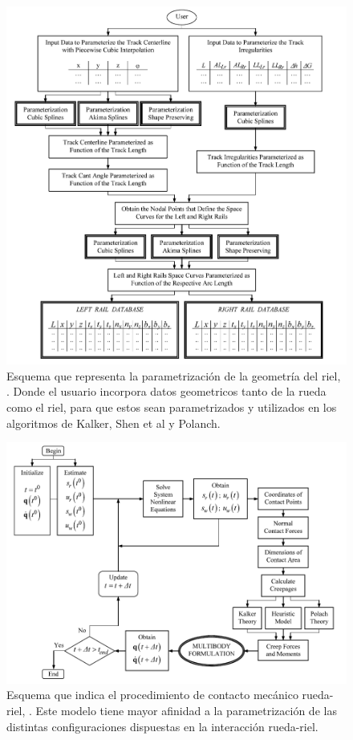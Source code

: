 \documentclass[main]{subfiles}
\begin{document}
\begin{figure}[!htbp]
\centering
    \includegraphics[scale=0.4]{Pombopar.png}
  \caption{Esquema que representa la parametrización  de la geometría del riel, \citet{springerlink:10.1007/s11044-007-9094-y}. Donde el usuario incorpora datos geometricos tanto de la rueda como el riel, para que estos sean parametrizados y utilizados en los algoritmos de Kalker, Shen et al y Polanch.}
  \label{fig:Pombopar}
\end{figure}  
\newpage

\begin{figure}[!htbp]
\centering
    \includegraphics[scale=0.3]{Pombopar2.png}
  \caption{Esquema que indica el procedimiento de contacto mecánico rueda-riel, \citet{springerlink:10.1007/s11044-007-9094-y}. Este modelo tiene mayor afinidad a la parametrización de las distintas configuraciones dispuestas en la interacción rueda-riel.}
  \label{fig:Pombopar2}
\end{figure}  
\end{document}
